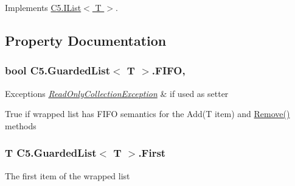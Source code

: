 Implements \hyperlink{interface_c5_1_1_i_list_aefcdef9983913d18ae05394e77a44c71}{C5.\+I\+List$<$ T $>$}.



\subsection{Property Documentation}
\hypertarget{class_c5_1_1_guarded_list_a9319f85c3a8830d606126743172d00e6}{}
\subsubsection[{F\+I\+F\+O}]{\setlength{\rightskip}{0pt plus 5cm}bool {\bf C5.\+Guarded\+List}$<$ T $>$.F\+I\+F\+O\hspace{0.3cm}{\ttfamily [get]}, {\ttfamily [set]}}\label{class_c5_1_1_guarded_list_a9319f85c3a8830d606126743172d00e6}





\begin{DoxyExceptions}{Exceptions}
{\em \hyperlink{class_c5_1_1_read_only_collection_exception}{Read\+Only\+Collection\+Exception}} & if used as setter\\
\hline
\end{DoxyExceptions}


True if wrapped list has F\+I\+F\+O semantics for the Add(\+T item) and \hyperlink{class_c5_1_1_guarded_list_afdeda008aae91bbbe607012e0e64bac4}{Remove()} methods\hypertarget{class_c5_1_1_guarded_list_a3bb363d3e068cef40c9fabfc68bb16c9}{}
\subsubsection[{First}]{\setlength{\rightskip}{0pt plus 5cm}T {\bf C5.\+Guarded\+List}$<$ T $>$.First\hspace{0.3cm}{\ttfamily [get]}}\label{class_c5_1_1_guarded_list_a3bb363d3e068cef40c9fabfc68bb16c9}




The first item of the wrapped list\hypertarget{class_c5_1_1_guarded_list_a153a69e81c48e5a2905fceb726aebc9e}{}
